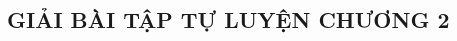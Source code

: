 \documentclass[12pt,a4paper,twoside,openany]{book}
\begin{document}
	
	\indapanvd
%	
%	
%	
%	
%	
%	
%	
%	
%	
%	
%	
	
	
	
	
	\subsection{GIẢI BÀI TẬP TỰ LUYỆN CHƯƠNG 2}
%	
%	
%	
%	
%	
%	
%	
%	
%	
%	
%	
%	
	
	
	
	
\end{document}
